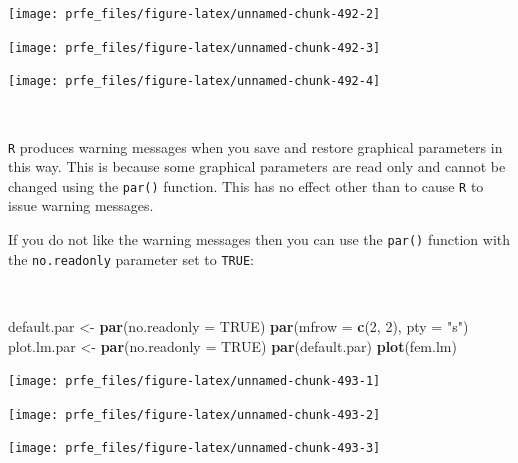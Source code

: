 \documentclass[12pt,a4paper]{book}
\newenvironment{Shaded}{\begin{snugshade}}{\end{snugshade}}
\newcommand{\DataTypeTok}[1]{\textcolor[rgb]{0.13,0.29,0.53}{#1}}
\newcommand{\DecValTok}[1]{\textcolor[rgb]{0.00,0.00,0.81}{#1}}
\newcommand{\KeywordTok}[1]{\textcolor[rgb]{0.13,0.29,0.53}{\textbf{#1}}}
\newcommand{\NormalTok}[1]{#1}
\newcommand{\OtherTok}[1]{\textcolor[rgb]{0.56,0.35,0.01}{#1}}
\newcommand{\StringTok}[1]{\textcolor[rgb]{0.31,0.60,0.02}{#1}}
\theoremstyle{definition}
\theoremstyle{definition}
\theoremstyle{definition}
\theoremstyle{remark}
\begin{document}
\begin{center}\texttt{[image: prfe\_files/figure-latex/unnamed-chunk-492-2]} \end{center}

\begin{center}\texttt{[image: prfe\_files/figure-latex/unnamed-chunk-492-3]} \end{center}

\begin{center}\texttt{[image: prfe\_files/figure-latex/unnamed-chunk-492-4]} \end{center}

~

\texttt{R} produces warning messages when you save and restore graphical
parameters in this way. This is because some graphical parameters are
read only and cannot be changed using the \texttt{par()} function. This
has no effect other than to cause \texttt{R} to issue warning messages.

If you do not like the warning messages then you can use the
\texttt{par()} function with the \texttt{no.readonly} parameter set to
\texttt{TRUE}:

~

\begin{Shaded}
\begin{Highlighting}[]
\NormalTok{default.par <-}\StringTok{ }\KeywordTok{par}\NormalTok{(}\DataTypeTok{no.readonly =} \OtherTok{TRUE}\NormalTok{)}
\KeywordTok{par}\NormalTok{(}\DataTypeTok{mfrow =} \KeywordTok{c}\NormalTok{(}\DecValTok{2}\NormalTok{, }\DecValTok{2}\NormalTok{), }\DataTypeTok{pty =} \StringTok{"s"}\NormalTok{)}
\NormalTok{plot.lm.par <-}\StringTok{ }\KeywordTok{par}\NormalTok{(}\DataTypeTok{no.readonly =} \OtherTok{TRUE}\NormalTok{)}
\KeywordTok{par}\NormalTok{(default.par)}
\KeywordTok{plot}\NormalTok{(fem.lm)}
\end{Highlighting}
\end{Shaded}

\begin{center}\texttt{[image: prfe\_files/figure-latex/unnamed-chunk-493-1]} \end{center}

\begin{center}\texttt{[image: prfe\_files/figure-latex/unnamed-chunk-493-2]} \end{center}

\begin{center}\texttt{[image: prfe\_files/figure-latex/unnamed-chunk-493-3]} \end{center}
\end{document}

